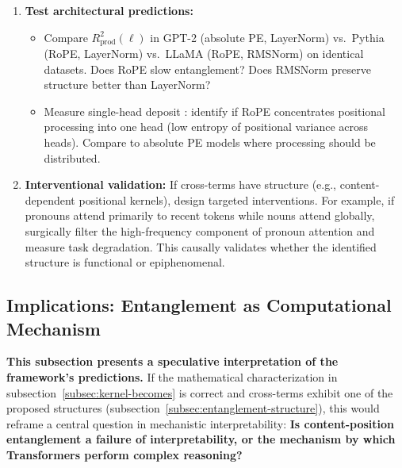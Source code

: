 \documentclass[11pt]{article}
\theoremstyle{definition}
\begin{document}
\begin{enumerate}
    \item \textbf{Test architectural predictions:}
    \begin{itemize}
        \item Compare $R^2_{\text{prod}}(\ell)$ in GPT-2 (absolute PE, LayerNorm) vs.\ Pythia (RoPE, LayerNorm) vs.\ LLaMA (RoPE, RMSNorm) on identical datasets. Does RoPE slow entanglement? Does RMSNorm preserve structure better than LayerNorm?
        \item Measure single-head deposit \cite{unpacking2025spectral}: identify if RoPE concentrates positional processing into one head (low entropy of positional variance across heads). Compare to absolute PE models where processing should be distributed.
    \end{itemize}

    \item \textbf{Interventional validation:} If cross-terms have structure (e.g., content-dependent positional kernels), design targeted interventions. For example, if pronouns attend primarily to recent tokens while nouns attend globally, surgically filter the high-frequency component of pronoun attention and measure task degradation. This causally validates whether the identified structure is functional or epiphenomenal.
\end{enumerate}

\subsection{Implications: Entanglement as Computational Mechanism}

\textbf{This subsection presents a speculative interpretation of the framework's predictions.} If the mathematical characterization in subsection~\ref{subsec:kernel-becomes} is correct and cross-terms exhibit one of the proposed structures (subsection~\ref{subsec:entanglement-structure}), this would reframe a central question in mechanistic interpretability: \textbf{Is content-position entanglement a failure of interpretability, or the mechanism by which Transformers perform complex reasoning?}
\end{document}
